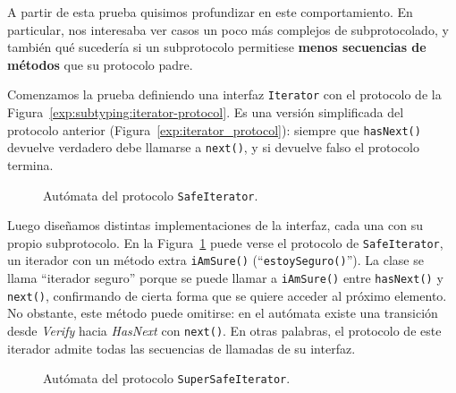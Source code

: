 A partir de esta prueba quisimos profundizar en este comportamiento. En particular, nos interesaba ver casos un poco más complejos de subprotocolado, y también qué sucedería si un subprotocolo permitiese \textbf{menos secuencias de métodos} que su protocolo padre.

Comenzamos la prueba definiendo una interfaz \texttt{Iterator} con el protocolo de la Figura~\ref{exp:subtyping:iterator-protocol}. Es una versión simplificada del protocolo anterior (Figura~\ref{exp:iterator_protocol}): siempre que \texttt{hasNext()} devuelve verdadero debe llamarse a \texttt{next()}, y si devuelve falso el protocolo termina.

\begin{figure}[htbp]
\centering
{}
\caption{Autómata del protocolo \texttt{SafeIterator}.}
\label{exp:safeiterator_protocol}
\end{figure}

Luego diseñamos distintas implementaciones de la interfaz, cada una con su propio subprotocolo. En la Figura~\ref{exp:safeiterator_protocol} puede verse el protocolo de \texttt{SafeIterator}, un iterador con un método extra \texttt{iAmSure()} (``\texttt{estoySeguro()}''). La clase se llama ``iterador seguro'' porque se puede llamar a \texttt{iAmSure()} entre \texttt{hasNext()} y \texttt{next()}, confirmando de cierta forma que se quiere acceder al próximo elemento. No obstante, este método puede omitirse: en el autómata existe una transición desde \textit{Verify} hacia \textit{HasNext} con \texttt{next()}. En otras palabras, el protocolo de este iterador admite todas las secuencias de llamadas de su interfaz.

\begin{figure}[htbp]
\centering
{}
\caption{Autómata del protocolo \texttt{SuperSafeIterator}.}
\label{exp:supersafeiterator_protocol}
\end{figure}

